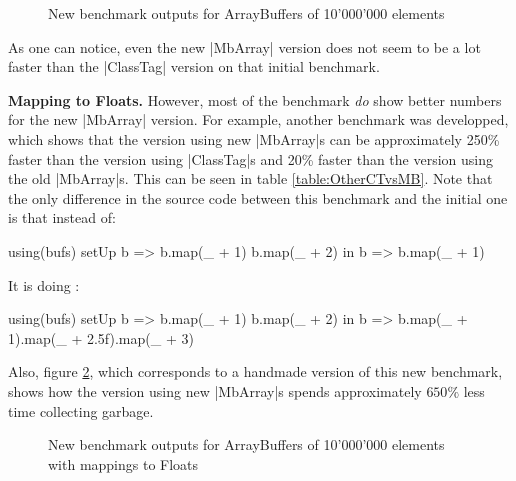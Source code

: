 \begin{figure}
\caption{New benchmark outputs for ArrayBuffers of 10'000'000 elements}
\label{fig:NewGcComp}
\end{figure}

As one can notice, even the new |MbArray| version does not seem to be a lot faster than the |ClassTag| version on that initial benchmark. 

\textbf{Mapping to Floats.} However, most of the benchmark \emph{do} show better numbers for the new |MbArray| version. For example, another benchmark was developped, which shows that the version using new |MbArray|s can be approximately 250\% faster than the version using |ClassTag|s and 20\% faster than the version using the old |MbArray|s. This can be seen in table \ref{table:OtherCTvsMB}. Note that the only difference in the source code between this benchmark and the initial one is that instead of:

\begin{lstlisting-nobreak}
  using(bufs) setUp {
    b => 
      b.map(_ + 1)
      b.map(_ + 2)
  } in {
    b => b.map(_ + 1)
  }
\end{lstlisting-nobreak}

It is doing : 

\begin{lstlisting-nobreak}
  using(bufs) setUp {
    b => 
      b.map(_ + 1)
      b.map(_ + 2)
  } in {
    b => b.map(_ + 1).map(_ + 2.5f).map(_ + 3)
  }
\end{lstlisting-nobreak}

Also, figure \ref{fig:OtherGcComp}, which corresponds to a handmade version of this new benchmark, shows how the version using new |MbArray|s spends approximately $650\%$ less time collecting garbage.



\begin{figure}
\caption{New benchmark outputs for ArrayBuffers of 10'000'000 elements with mappings to Floats}
\label{fig:OtherGcComp}
\end{figure}

